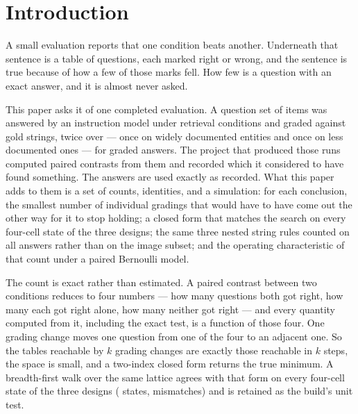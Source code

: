 \section{Introduction}

A small evaluation reports that one condition beats another. Underneath that
sentence is a table of questions, each marked right or wrong, and the sentence
is true because of how a few of those marks fell. How few is a question with an
exact answer, and it is almost never asked.

This paper asks it of one completed evaluation. A question set of \Questions{}
items was answered by an instruction model under \ConditionsWord{} retrieval
conditions and graded against gold strings, twice over --- once on widely
documented entities and once on less documented ones --- for \Answers{} graded
answers. The project that produced those runs computed \Contrasts{} paired
contrasts from them and recorded which it considered to have found something.
The answers are used exactly as recorded. What this paper adds to them is a set
of counts, identities, and a simulation: for each conclusion, the smallest
number of individual gradings that would have to have come out the other way
for it to stop holding; a closed form that matches the search on every
four-cell state of the three designs; the same three nested string rules
counted on all \Answers{} answers rather than on the image subset; and the
operating characteristic of that count under a paired Bernoulli model.

The count is exact rather than estimated. A paired contrast between two
conditions reduces to four numbers --- how many questions both got right, how
many each got right alone, how many neither got right --- and every quantity
computed from it, including the exact test, is a function of those four. One
grading change moves one question from one of the four to an adjacent one. So
the tables reachable by $k$ grading changes are exactly those reachable in $k$
steps, the space is small, and a two-index closed form returns the true minimum.
A breadth-first walk over the same lattice agrees with that form on every
four-cell state of the three designs (\ClosedFormStates{} states,
\ClosedFormMismatches{} mismatches) and is retained as the build's unit test.

